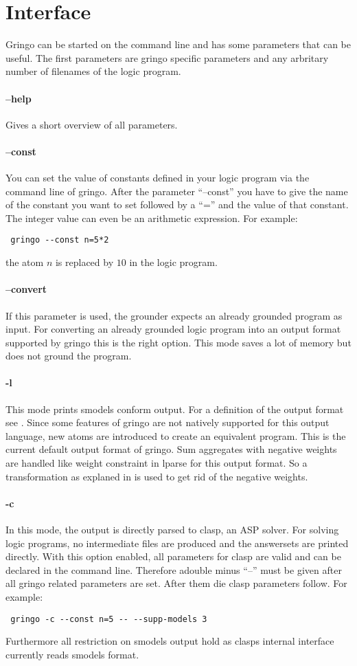 \documentclass[a4paper,10pt]{article}
\begin{document}
\section{Interface}
Gringo can be started on the command line and has some parameters that can be useful.
The first parameters are gringo specific parameters and any arbritary number of filenames of the logic program.
\paragraph{--help}
Gives a short overview of all parameters.
\paragraph{--const}
You can set the value of constants defined in your logic program via the command line of gringo.
After the parameter ``--const'' you have to give the name of the constant you want to set followed by a ``='' and the value of that constant. The integer value can even be an arithmetic expression. For example:
\begin{verbatim}
 gringo --const n=5*2
\end{verbatim}
the atom $n$ is replaced by $10$ in the logic program.

\paragraph{--convert}
If this parameter is used, the grounder expects an already grounded program as input.
For converting an already grounded logic program into an output format supported by gringo this is the right option. This mode saves a lot of memory but does not ground the program.
\paragraph{-l}
This mode prints smodels conform output. For a definition of the output format see \cite{lparseManual}.
Since some features of gringo are not natively supported for this output language, new atoms are introduced to create an equivalent program.\newline
This is the current default output format of gringo.
Sum aggregates with negative weights are handled like weight constraint in lparse for this output format. So a transformation as explaned in \cite{lparseManual} is used to get rid of the negative weights.
\paragraph{-c}
In this mode, the output is directly parsed to clasp, an ASP solver. For solving logic programs, no intermediate files are produced and the answersets are printed directly.
With this option enabled, all parameters for clasp are valid and can be declared in the command line. Therefore adouble minus ``--'' must be given after all gringo related parameters are set. After them die clasp parameters follow.
For example:
\begin{verbatim}
 gringo -c --const n=5 -- --supp-models 3
\end{verbatim}
Furthermore all restriction on smodels output hold as clasps internal interface currently reads smodels format.
\end{document}

